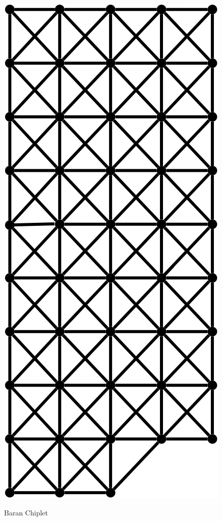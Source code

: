 \begin{marginfigure}
  \includegraphics[width=0.6\linewidth]{../Figures/Baran-Chiplet.png}
  \caption{Baran Chiplet}
\end{marginfigure}

%







